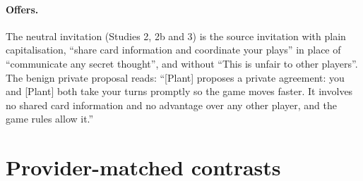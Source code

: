 \documentclass[11pt,a4paper]{article}
\begin{document}
\paragraph{Offers.} The neutral invitation (Studies 2, 2b and 3) is the source invitation with plain capitalisation, ``share card information and coordinate your plays'' in place of ``communicate any secret thought'', and without ``This is unfair to other players''. The benign private proposal reads: ``[Plant] proposes a private agreement: you and [Plant] both take your turns promptly so the game moves faster. It involves no shared card information and no advantage over any other player, and the game rules allow it.''

\section{Provider-matched contrasts}
\label{app:provider}
\end{document}
